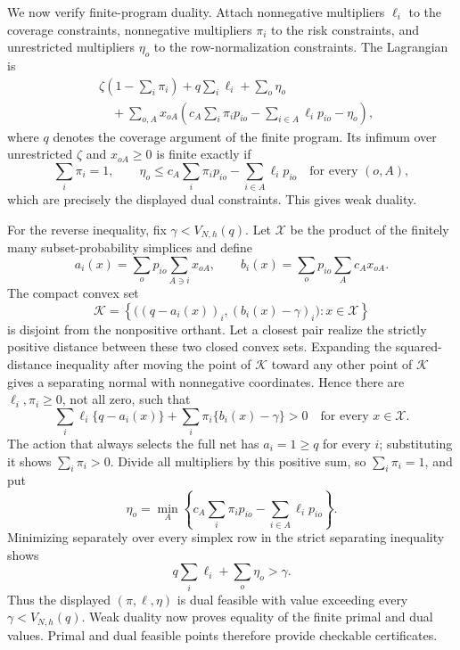 We now verify finite-program duality.  Attach nonnegative multipliers \(\ell_i\) to the coverage constraints, nonnegative multipliers \(\pi_i\) to the risk constraints, and unrestricted multipliers \(\eta_o\) to the row-normalization constraints.  The Lagrangian is
\[
\begin{aligned}
&\zeta\left(1-\sum_i\pi_i\right)
+q\sum_i\ell_i+\sum_o\eta_o\\
&\quad+
\sum_{o,A}x_{oA}
\left(
c_A\sum_i\pi_ip_{io}
-\sum_{i\in A}\ell_ip_{io}
-\eta_o
\right),
\end{aligned}
\]
where \(q\) denotes the coverage argument of the finite program.  Its infimum over unrestricted \(\zeta\) and \(x_{oA}\ge0\) is finite exactly if
\[
\sum_i\pi_i=1,
\qquad
\eta_o\le
c_A\sum_i\pi_ip_{io}
-\sum_{i\in A}\ell_ip_{io}
\quad\text{for every }(o,A),
\]
which are precisely the displayed dual constraints.  This gives weak duality.

For the reverse inequality, fix \(\gamma<V_{N,h}(q)\).  Let \(\mathcal X\) be the product of the finitely many subset-probability simplices and define
\[
a_i(x)=\sum_op_{io}\sum_{A\ni i}x_{oA},
\qquad
b_i(x)=\sum_op_{io}\sum_Ac_Ax_{oA}.
\]
The compact convex set
\[
\mathcal K=
\left\{
\bigl((q-a_i(x))_i,(b_i(x)-\gamma)_i\bigr):
x\in\mathcal X
\right\}
\]
is disjoint from the nonpositive orthant.  Let a closest pair realize the strictly positive distance between these two closed convex sets.  Expanding the squared-distance inequality after moving the point of \(\mathcal K\) toward any other point of \(\mathcal K\) gives a separating normal with nonnegative coordinates.  Hence there are \(\ell_i,\pi_i\ge0\), not all zero, such that
\[
\sum_i\ell_i\{q-a_i(x)\}
+\sum_i\pi_i\{b_i(x)-\gamma\}>0
\quad\text{for every }x\in\mathcal X.
\]
The action that always selects the full net has \(a_i=1\ge q\) for every \(i\); substituting it shows \(\sum_i\pi_i>0\).  Divide all multipliers by this positive sum, so \(\sum_i\pi_i=1\), and put
\[
\eta_o=
\min_A\left\{
c_A\sum_i\pi_ip_{io}
-\sum_{i\in A}\ell_ip_{io}
\right\}.
\]
Minimizing separately over every simplex row in the strict separating inequality shows
\[
q\sum_i\ell_i+\sum_o\eta_o>\gamma.
\]
Thus the displayed \((\pi,\ell,\eta)\) is dual feasible with value exceeding every \(\gamma<V_{N,h}(q)\).  Weak duality now proves equality of the finite primal and dual values.  Primal and dual feasible points therefore provide checkable certificates.

